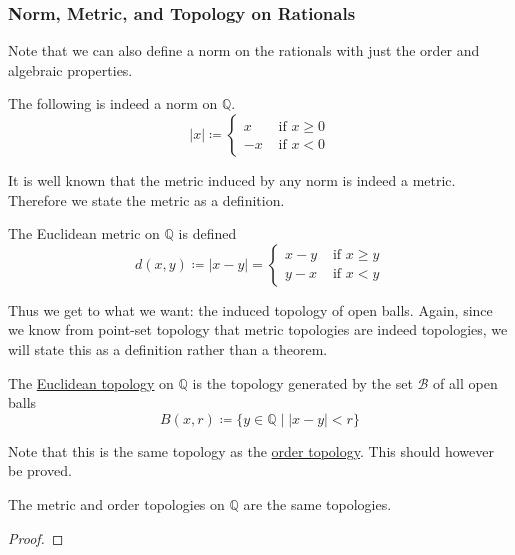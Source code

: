\subsubsection{Norm, Metric, and Topology on Rationals}

  Note that we can also define a norm on the rationals with just the order and algebraic properties. 

  \begin{theorem}
    \label{thm:norm-on-q}
 
    The following is indeed a norm on $\mathbb{Q}$. 
    \begin{equation}
      |x| \coloneqq \begin{cases} x & \text{ if } x \geq 0 \\ -x & \text{ if } x < 0 \end{cases}
    \end{equation} 
  \end{theorem} 

  It is well known that the metric induced by any norm is indeed a metric. Therefore we state the metric as a definition. 

  \begin{definition}
    \label{def:metric-on-q}
    The Euclidean metric on $\mathbb{Q}$ is defined 
    \begin{equation}
      d(x, y) \coloneqq |x - y| = \begin{cases} x - y & \text{ if } x \geq y \\ y - x & \text{ if } x < y \end{cases}
    \end{equation}
  \end{definition}

  Thus we get to what we want: the induced topology of open balls. 
  Again, since we know from point-set topology that metric topologies are indeed topologies, we will state this as a definition rather than a theorem.  

  \begin{definition}
    \label{def:open-ball-topology-on-q}
    The \hyperref[real-thm:euclidean-topology]{Euclidean topology} on $\mathbb{Q}$ is the topology generated by the set $\mathscr{B}$ of all open balls
    \begin{equation}
      B(x, r) \coloneqq \{ y \in \mathbb{Q} \mid |x - y| < r \}
    \end{equation} 
  \end{definition}

  Note that this is the same topology as the \hyperref[pst-def:order-topology]{order topology}. This should however be proved. 

  \begin{theorem}
    \label{thm:metric-and-order-topologies-on-q}
    The metric and order topologies on $\mathbb{Q}$ are the same topologies. 
  \end{theorem}
  \begin{proof}
    
  \end{proof}

